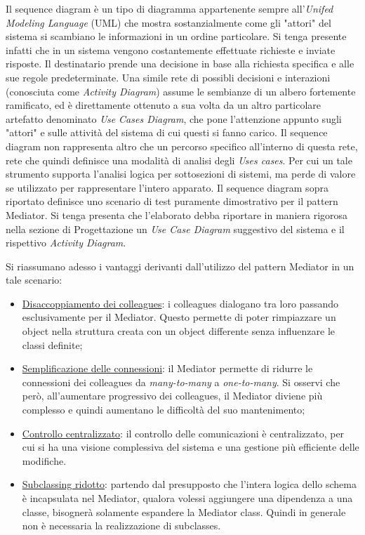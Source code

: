\documentclass{article}
\begin{document}
\begin{sloppy}
\bigbreak

Il sequence diagram è un tipo di diagramma appartenente sempre all'\textit{Unifed Modeling Language} (UML) che mostra sostanzialmente come gli "attori" del sistema si scambiano le informazioni in un ordine particolare. Si tenga presente infatti che in un sistema vengono costantemente effettuate richieste e inviate risposte. Il destinatario prende una decisione in base alla richiesta specifica e alle sue regole predeterminate. Una simile rete di possibli decisioni e interazioni (conosciuta come \textit{Activity Diagram}) assume le sembianze di un albero fortemente ramificato, ed è direttamente ottenuto a sua volta da un altro particolare artefatto denominato \textit{Use Cases Diagram}, che pone l'attenzione appunto sugli "attori" e sulle attività del sistema di cui questi si fanno carico. Il sequence diagram non rappresenta altro che un percorso specifico all'interno di questa rete, rete che quindi definisce una modalità di analisi degli \textit{Uses cases}.
Per cui un tale strumento supporta l'analisi logica per sottosezioni di sistemi, ma perde di valore se utilizzato per rappresentare l'intero apparato.
Il sequence diagram sopra riportato definisce uno scenario di test puramente dimostrativo per il pattern Mediator.
Si tenga presenta che l'elaborato debba riportare in maniera rigorosa nella sezione di Progettazione un \textit{Use Case Diagram} suggestivo del sistema e il rispettivo \textit{Activity Diagram}.



\bigbreak
Si riassumano adesso i vantaggi derivanti dall'utilizzo del pattern Mediator in un tale scenario:
\begin{itemize}
    \item \underline{Disaccoppiamento dei colleagues}: i colleagues dialogano tra loro passando esclusivamente per il Mediator. Questo permette di poter rimpiazzare un object nella struttura creata con un object differente senza influenzare le classi definite;
    \item \underline{Semplificazione delle connessioni}: il Mediator permette di ridurre le connessioni dei colleagues da \textit{many-to-many} a \textit{one-to-many}. Si osservi che però, all'aumentare progressivo dei colleagues, il Mediator diviene più complesso e quindi aumentano le difficoltà del suo mantenimento;
    \item \underline{Controllo centralizzato}: il controllo delle comunicazioni è centralizzato, per cui si ha una visione complessiva del sistema e una gestione più efficiente delle modifiche.
    \item \underline{Subclassing ridotto}:  partendo dal presupposto che l'intera logica dello schema è incapsulata nel Mediator, qualora volessi aggiungere una dipendenza a una classe, bisognerà solamente espandere la Mediator class. Quindi in generale non è necessaria la realizzazione di subclasses.
\end{itemize}


\end{sloppy}
\end{document}

